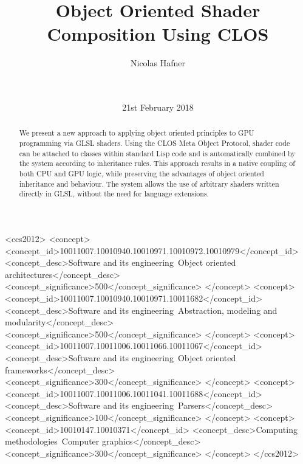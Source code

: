 \documentclass{sig-alternate}
\begin{document}
\doi{}
\isbn{}

\begin{CCSXML}
  <ccs2012>
  <concept>
  <concept_id>10011007.10010940.10010971.10010972.10010979</concept_id>
  <concept_desc>Software and its engineering~Object oriented architectures</concept_desc>
  <concept_significance>500</concept_significance>
  </concept>
  <concept>
  <concept_id>10011007.10010940.10010971.10011682</concept_id>
  <concept_desc>Software and its engineering~Abstraction, modeling and modularity</concept_desc>
  <concept_significance>500</concept_significance>
  </concept>
  <concept>
  <concept_id>10011007.10011006.10011066.10011067</concept_id>
  <concept_desc>Software and its engineering~Object oriented frameworks</concept_desc>
  <concept_significance>300</concept_significance>
  </concept>
  <concept>
  <concept_id>10011007.10011006.10011041.10011688</concept_id>
  <concept_desc>Software and its engineering~Parsers</concept_desc>
  <concept_significance>100</concept_significance>
  </concept>
  <concept>
  <concept_id>10010147.10010371</concept_id>
  <concept_desc>Computing methodologies~Computer graphics</concept_desc>
  <concept_significance>300</concept_significance>
  </concept>
  </ccs2012>
\end{CCSXML}


\title{Object Oriented Shader Composition Using CLOS}

\author{
  \alignauthor
  Nicolas Hafner\\
  \\
  \\
}
\date{21st February 2018}

\maketitle

\begin{abstract}
  We present a new approach to applying object oriented principles to GPU programming via GLSL shaders. Using the CLOS Meta Object Protocol, shader code can be attached to classes within standard Lisp code and is automatically combined by the system according to inheritance rules. This approach results in a native coupling of both CPU and GPU logic, while preserving the advantages of object oriented inheritance and behaviour. The system allows the use of arbitrary shaders written directly in GLSL, without the need for language extensions.
\end{abstract}
\end{document}
